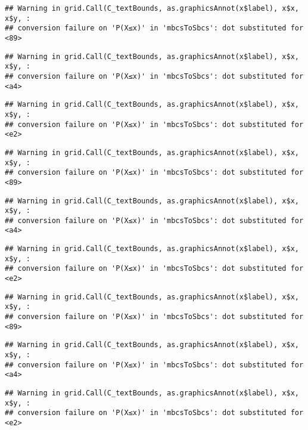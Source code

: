 \documentclass[
]{book}
\begin{document}
\begin{verbatim}
## Warning in grid.Call(C_textBounds, as.graphicsAnnot(x$label), x$x, x$y, :
## conversion failure on 'P(X≤x)' in 'mbcsToSbcs': dot substituted for <89>
\end{verbatim}

\begin{verbatim}
## Warning in grid.Call(C_textBounds, as.graphicsAnnot(x$label), x$x, x$y, :
## conversion failure on 'P(X≤x)' in 'mbcsToSbcs': dot substituted for <a4>
\end{verbatim}

\begin{verbatim}
## Warning in grid.Call(C_textBounds, as.graphicsAnnot(x$label), x$x, x$y, :
## conversion failure on 'P(X≤x)' in 'mbcsToSbcs': dot substituted for <e2>
\end{verbatim}

\begin{verbatim}
## Warning in grid.Call(C_textBounds, as.graphicsAnnot(x$label), x$x, x$y, :
## conversion failure on 'P(X≤x)' in 'mbcsToSbcs': dot substituted for <89>
\end{verbatim}

\begin{verbatim}
## Warning in grid.Call(C_textBounds, as.graphicsAnnot(x$label), x$x, x$y, :
## conversion failure on 'P(X≤x)' in 'mbcsToSbcs': dot substituted for <a4>
\end{verbatim}

\begin{verbatim}
## Warning in grid.Call(C_textBounds, as.graphicsAnnot(x$label), x$x, x$y, :
## conversion failure on 'P(X≤x)' in 'mbcsToSbcs': dot substituted for <e2>
\end{verbatim}

\begin{verbatim}
## Warning in grid.Call(C_textBounds, as.graphicsAnnot(x$label), x$x, x$y, :
## conversion failure on 'P(X≤x)' in 'mbcsToSbcs': dot substituted for <89>
\end{verbatim}

\begin{verbatim}
## Warning in grid.Call(C_textBounds, as.graphicsAnnot(x$label), x$x, x$y, :
## conversion failure on 'P(X≤x)' in 'mbcsToSbcs': dot substituted for <a4>
\end{verbatim}

\begin{verbatim}
## Warning in grid.Call(C_textBounds, as.graphicsAnnot(x$label), x$x, x$y, :
## conversion failure on 'P(X≤x)' in 'mbcsToSbcs': dot substituted for <e2>
\end{verbatim}
\end{document}

